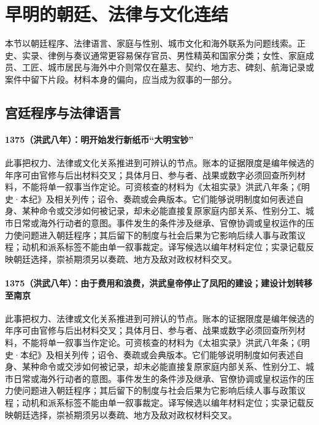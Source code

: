 \section{早明的朝廷、法律与文化连结}

本节以朝廷程序、法律语言、家庭与性别、城市文化和海外联系为问题线索。正史、实录、律例与奏议通常更容易保存官员、男性精英和国家分类；女性、家庭成员、工匠、城市居民与海外中介则常仅在墓志、契约、地方志、碑刻、航海记录或案件中留下片段。材料本身的偏向，应当成为叙事的一部分。

\subsection{宫廷程序与法律语言}

\paragraph{1375（洪武八年）：明开始发行新纸币“大明宝钞”} 此事把权力、法律或文化关系推进到可辨认的节点。账本的证据限度是编年候选的年序可由官修与后出材料交叉；具体月日、参与者、战果或数字必须回查所列材料，不能将单一叙事当作定论。可资核查的材料为《太祖实录》洪武八年条；《明史·本纪》及相关列传；诏令、奏疏或会典版本。它们能够说明制度如何表述自身、某种命令或交涉如何被记录，却未必能直接复原家庭内部关系、性别分工、城市日常或海外行动者的意图。事件发生的条件涉及继承、官僚协调或皇权运作的压力使问题进入朝廷程序；其后留下的制度与社会后果为它影响后续人事与政策议程；动机和派系标签不能由单一叙事裁定。译写候选以编年材料定位；实录记载反映朝廷选择，崇祯期须另以奏疏、地方及敌对政权材料交叉。

\paragraph{1375（洪武八年）：由于费用和浪费，洪武皇帝停止了凤阳的建设；建设计划转移至南京} 此事把权力、法律或文化关系推进到可辨认的节点。账本的证据限度是编年候选的年序可由官修与后出材料交叉；具体月日、参与者、战果或数字必须回查所列材料，不能将单一叙事当作定论。可资核查的材料为《太祖实录》洪武八年条；《明史·本纪》及相关列传；诏令、奏疏或会典版本。它们能够说明制度如何表述自身、某种命令或交涉如何被记录，却未必能直接复原家庭内部关系、性别分工、城市日常或海外行动者的意图。事件发生的条件涉及继承、官僚协调或皇权运作的压力使问题进入朝廷程序；其后留下的制度与社会后果为它影响后续人事与政策议程；动机和派系标签不能由单一叙事裁定。译写候选以编年材料定位；实录记载反映朝廷选择，崇祯期须另以奏疏、地方及敌对政权材料交叉。

